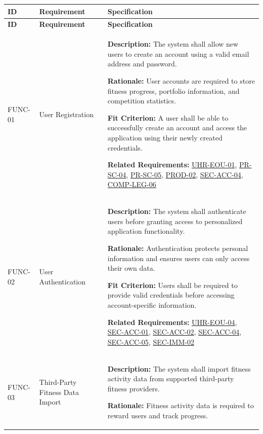 \documentclass[12pt]{article}
\begin{document}
\small
\setlength{\tabcolsep}{4pt}
\begin{xltabular}{\textwidth}{|p{2.6cm}|p{3.4cm}|X|}
\hline
\textbf{ID} & \textbf{Requirement} & \textbf{Specification} \\
\hline
\endfirsthead
\hline
\textbf{ID} & \textbf{Requirement} & \textbf{Specification} \\
\hline
\endhead

FUNC-01\hypertarget{req:FUNC-01}{} & 
User Registration & 
\textbf{Description:} The system shall allow new users to create an account using a valid email address and password. 

\textbf{Rationale:} User accounts are required to store fitness progress, portfolio information, and competition statistics. 

\textbf{Fit Criterion:} A user shall be able to successfully create an account and access the application using their newly created credentials.

\textbf{Related Requirements:} \hyperlink{req:UHR-EOU-01}{UHR-EOU-01}, \hyperlink{req:PR-SC-04}{PR-SC-04}, \hyperlink{req:PR-SC-05}{PR-SC-05}, \hyperlink{req:PROD-02}{PROD-02}, \hyperlink{req:SEC-ACC-04}{SEC-ACC-04}, \hyperlink{req:COMP-LEG-06}{COMP-LEG-06}\\
\hline

FUNC-02\hypertarget{req:FUNC-02}{} & 
User Authentication & 
\textbf{Description:} The system shall authenticate users before granting access to personalized application functionality.

\textbf{Rationale:} Authentication protects personal information and ensures users can only access their own data.

\textbf{Fit Criterion:} Users shall be required to provide valid credentials before accessing account-specific information.

\textbf{Related Requirements:} \hyperlink{req:UHR-EOU-04}{UHR-EOU-04}, \hyperlink{req:SEC-ACC-01}{SEC-ACC-01}, \hyperlink{req:SEC-ACC-02}{SEC-ACC-02}, \hyperlink{req:SEC-ACC-04}{SEC-ACC-04}, \hyperlink{req:SEC-ACC-05}{SEC-ACC-05}, \hyperlink{req:SEC-IMM-02}{SEC-IMM-02}\\
\hline

FUNC-03\hypertarget{req:FUNC-03}{} & 
Third-Party Fitness Data Import & 
\textbf{Description:} The system shall import fitness activity data from supported third-party fitness providers.

\textbf{Rationale:} Fitness activity data is required to reward users and track progress.


\end{xltabular}
\end{document}
